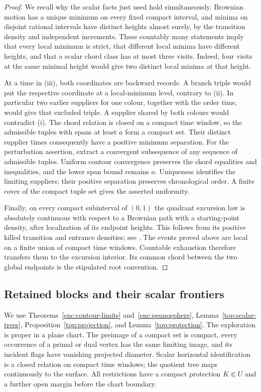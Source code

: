 \begin{proof}
We recall why the scalar facts just used hold simultaneously.  Brownian
motion has a unique minimum on every fixed compact interval, and minima
on disjoint rational intervals have distinct heights almost surely,
by the transition density and independent increments.  These countably
many statements imply that every local minimum is strict, that different
local minima have different heights, and that a scalar chord class has
at most three visits.  Indeed, four visits at the same minimal height
would give two distinct local minima at that height.

At a time in (iii), both coordinates are backward records.  A branch
triple would put the respective coordinate at a local-minimum level,
contrary to (ii).  In particular two earlier suppliers for one colour,
together with the order time, would give that excluded triple.
A supplier shared by both colours would contradict (i).
The chord relation is closed on a compact time window, so the
admissible tuples with spans at least $a$ form a compact set.  Their
distinct supplier times consequently have a positive minimum separation.
For the perturbation assertion, extract a convergent subsequence of
any sequence of admissible tuples.  Uniform contour convergence
preserves the chord equalities and inequalities, and the lower span
bound remains $a$.  Uniqueness identifies the limiting suppliers;
their positive separation preserves chronological order.  A finite
cover of the compact tuple set gives the asserted uniformity.

Finally, on every compact subinterval of $(0,1)$ the quadrant excursion
law is absolutely continuous with respect to a Brownian path with a
starting-point density, after localization of its endpoint heights.
This follows from its positive killed transition and entrance densities;
see \cite[Section 2]{GwynneSunFKIII}.  The events proved above are local
on a finite union of compact time windows.  Countable exhaustion
therefore transfers them to the excursion interior.  Its common chord
between the two global endpoints is the stipulated root convention.
\end{proof}

\subsection{Retained blocks and their scalar frontiers}

We use Theorems~\ref{enc:contour-limits} and~\ref{enc:peanosphere},
Lemma~\ref{top:scalar-trees}, Proposition~\ref{top:projection},
and Lemma~\ref{top:protection}.  The exploration is proper in a plane chart.
The preimage of a compact set is compact, every occurrence of a primal
or dual vertex has the same limiting image, and its incident flags have
vanishing projected diameter.  Scalar horizontal identification is a
closed relation on compact time windows; the quotient tree maps
continuously to the surface.  All restrictions have a compact protection
\(K\Subset U\) and a further open margin before the chart boundary.

